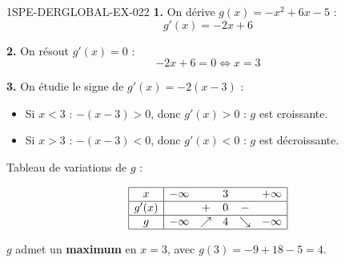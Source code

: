 \begin{corrige}{1SPE-DERGLOBAL-EX-022}
\textbf{1.} On dérive $g(x) = -x^2 + 6x - 5$ :
\[
g'(x) = -2x + 6
\]

\textbf{2.} On résout $g'(x) = 0$ :
\[
-2x + 6 = 0 \iff x = 3
\]

\textbf{3.} On étudie le signe de $g'(x) = -2(x - 3)$ :
\begin{itemize}
\item Si $x < 3$ : $-(x-3) > 0$, donc $g'(x) > 0$ : $g$ est croissante.
\item Si $x > 3$ : $-(x-3) < 0$, donc $g'(x) < 0$ : $g$ est décroissante.
\end{itemize}

Tableau de variations de $g$ :

\[
\begin{array}{|c|ccccc|}
\hline
x & -\infty & & 3 & & +\infty \\
\hline
g'(x) & & + & 0 & - & \\
\hline
g & -\infty & \nearrow & 4 & \searrow & -\infty \\
\hline
\end{array}
\]

$g$ admet un \textbf{maximum} en $x = 3$, avec $g(3) = -9 + 18 - 5 = \boxed{4}$.
\end{corrige}
